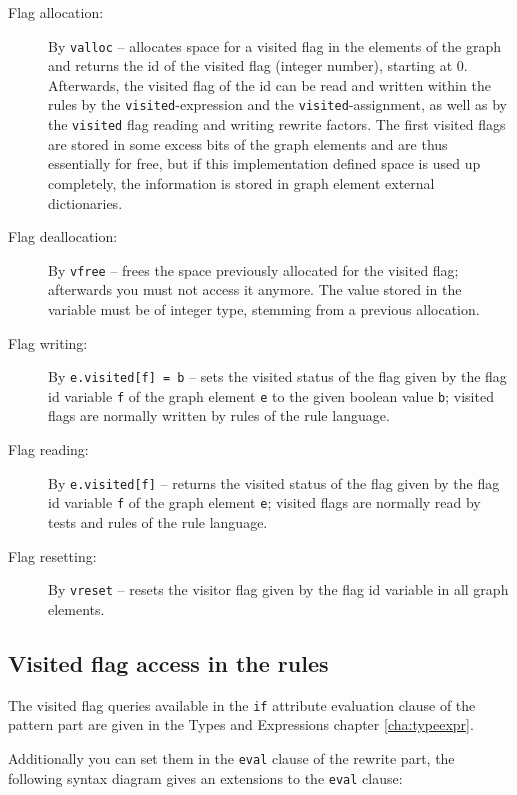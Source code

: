 \begin{description}
\item[Flag allocation:] By \texttt{valloc}\label{allocvisitflag} -- allocates space for a visited flag in the elements of the graph and returns the id of the visited flag (integer number), starting at 0.
Afterwards, the visited flag of the id can be read and written within the rules by the \texttt{visited}-expression and the \texttt{visited}-assignment,
as well as by the \texttt{visited} flag reading and writing rewrite factors.
The first visited flags are stored in some excess bits of the graph elements and are thus essentially for free,
but if this implementation defined space is used up completely, the information is stored in graph element external dictionaries.
\item[Flag deallocation:] By \texttt{vfree} -- frees the space previously allocated for the visited flag; afterwards you must not access it anymore. 
The value stored in the variable must be of integer type, stemming from a previous allocation.
\item[Flag writing:] By \texttt{e.visited[f] = b} -- sets the visited status of the flag given by the flag id variable \texttt{f} of the graph element \texttt{e} to the given boolean value \texttt{b}; visited flags are normally written by rules of the rule language.
\item[Flag reading:] By \texttt{e.visited[f]} -- returns the visited status of the flag given by the flag id variable \texttt{f} of the graph element \texttt{e}; visited flags are normally read by tests and rules of the rule language.
\item[Flag resetting:] By \texttt{vreset} -- resets the visitor flag given by the flag id variable in all graph elements.
\end{description}


\subsection{Visited flag access in the rules} \label{sub:visitedaccess}

The visited flag queries available in the \texttt{if} attribute evaluation clause of the pattern part are given in the Types and Expressions chapter \ref{cha:typeexpr}.

Additionally you can set them in the \texttt{eval} clause of the rewrite part, the following syntax diagram gives an extensions to the \texttt{eval} clause:

